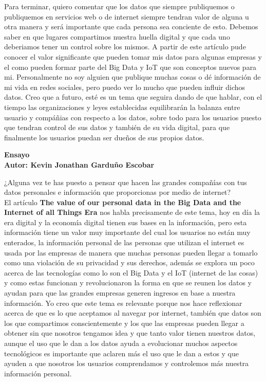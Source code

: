 \documentclass[12pt]{report}
\begin{document}
\begin{enumerate}[label=\textbf{\arabic*.}, leftmargin=*]
\begin{enumerate}[label=\textbf{\alph*.}, leftmargin=*, itemsep=1.0em]
Para terminar, quiero comentar que los datos que siempre publiquemos o publiquemos en servicios web o de internet siempre tendran valor de alguna u otra manera y será importante que cada persona sea conciente de esto. Debemos saber en que lugares compartimos nuestra huella digital y que cada uno deberiamos tener un control sobre los mismos. A partir de este artículo pude conocer el valor significante que pueden tomar mis datos para algunas empresas y el como pueden formar parte del Big Data y IoT que son conceptos nuevos para mi. Personalmente no soy alguien que publique muchas cosas o dé información de mi vida en redes sociales, pero puedo ver lo mucho que pueden influir dichos datos. Creo que a futuro, esté es un tema que seguira dando de que hablar, con el tiempo las organizaciones y leyes establecidas equilibrarán la balanza entre usuario y compáñias con respecto a los datos, sobre todo para los usuarios puesto que tendran control de sus datos y también de su vida digital, para que finalmente los usuarios puedan ser dueños de sus propios datos.

\newpage
\textbf{Ensayo\\
        Autor: Kevin Jonathan Garduño Escobar}

¿Alguna vez te has puesto a pensar que hacen las grandes compañías con tus datos personales e información que proporcionas por medio de internet?\\

El artículo \textbf{The value of our personal data in the Big Data and the Internet of all Things Era} nos habla precisamente de este tema, hoy en día la era digital y la economía digital tienen sus bases en la información, pero esta información tiene un valor muy importante del cual los usuarios no están muy enterados, la información personal de las personas que utilizan el internet es usada por las empresas de manera que muchas personas pueden llegar a tomarlo como una violación de su privacidad y sus derechos, además se explora un poco acerca de las tecnologías como lo son el Big Data y el IoT (internet de las cosas) y como estas funcionan y revolucionaron la forma en que se reunen los datos y ayudan para que las grandes empresas generen ingresos en base a nuestra información. Yo creo que este tema es relevante porque nos hace reflexionar acerca de que es lo que aceptamos al navegar por internet, también que datos son los que compartimos conscientemente y los que las empresas pueden llegar a obtener sin que nosotros tengamos idea y que tanto valor tienen nuestros datos, aunque el uso que le dan a los datos ayuda a evolucionar muchos aspectos tecnológicos es importante que aclaren más el uso que le dan a estos y que ayuden a que nosotros los usuarios comprendamos y controlemos más nuestra información personal.\\


\end{enumerate}
\end{enumerate}
\end{document}

